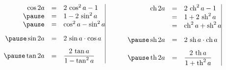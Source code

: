 \begin{frame}
\begin{columns}

\begin{column}{2cm}
  
\end{column}

\begin{column}{6cm}
$$\begin{array}{rcl@{\vrule depth 1.2ex height 3ex width 0mm }}
\cos 2a &=& 2\,\cos^2a-1 \\
\pause
    &=& 1-2\,\sin^2a\\
\pause
    &=& \cos^2a-\sin^2a\\[3mm]
\pause
\sin 2a &=& 2\,\sin a\cdot\cos a\\[3mm]
\pause
\tan 2a &=& \displaystyle\frac{2\,\tan a}{1-\tan^2 a}    
  \end{array}$$
\end{column}

\pause

\begin{column}{6cm}

$$\begin{array}{rcl@{\vrule depth 1.2ex height 3ex width 0mm }}
\ch 2a &=& 2\,\ch^2a-1\\
    &=& 1+2\,\sh^2a\\
    &=& \ch^2a+\sh^2a\\[3mm]
\pause
\sh 2a &=& 2\,\sh a\cdot\ch a\\[3mm]
\pause
\tanh 2a &=& \displaystyle\frac{2\,\tanh a}{1+\tanh^2 a}\\    
  \end{array}$$
\end{column}
\end{columns}
\end{frame}




